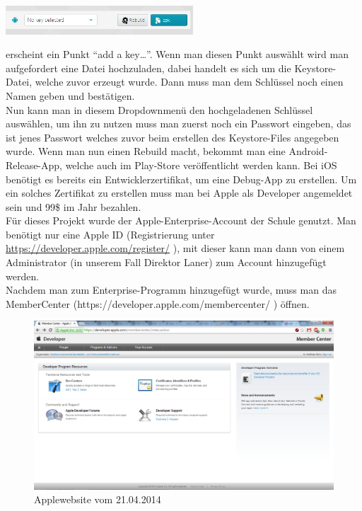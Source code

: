 \includegraphics[keepaspectratio=true, width=7cm]{images/phoneGap/PhoneGap3.png}

erscheint ein Punkt \enquote{add a key…}. Wenn man diesen Punkt auswählt wird man aufgefordert eine Datei hochzuladen, dabei handelt es sich um die Keystore-Datei, welche zuvor erzeugt wurde. Dann muss man dem Schlüssel noch einen Namen geben und bestätigen.\\
Nun kann man in diesem Dropdownmenü den hochgeladenen Schlüssel auswählen, um ihn zu nutzen muss man zuerst noch ein Passwort eingeben, das ist jenes Passwort welches zuvor beim erstellen des Keystore-Files angegeben wurde. Wenn man nun einen Rebuild macht, bekommt man eine Android-Release-App, welche auch im Play-Store veröffentlicht werden kann.
Bei iOS benötigt es bereits ein Entwicklerzertifikat, um eine Debug-App zu erstellen. Um ein solches Zertifikat zu erstellen muss man bei Apple als Developer angemeldet sein und 99\$ im Jahr bezahlen.\\
Für dieses Projekt wurde der Apple-Enterprise-Account der Schule genutzt. Man benötigt nur eine Apple ID (Registrierung unter \href{https://developer.apple.com/register/}{https://developer.apple.com/register/} ), mit dieser kann man dann von einem Administrator (in unserem Fall Direktor Laner) zum Account hinzugefügt werden.\\
Nachdem man zum Enterprise-Programm hinzugefügt wurde, muss man das MemberCenter (https://developer.apple.com/membercenter/ ) öffnen.\\

\begin{figure}[H]
\includegraphics[keepaspectratio=true, width=14cm]{images/phoneGap/AppleMemberCenter1.png}
\caption{Applewebsite vom 21.04.2014}
\end{figure}

